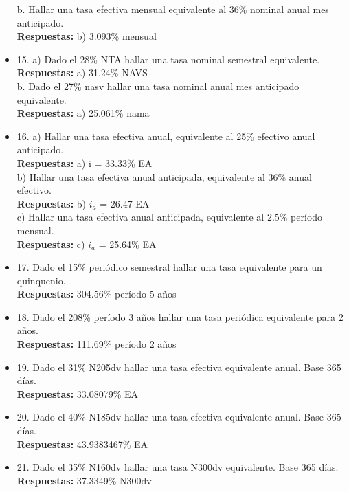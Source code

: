 \begin{itemize}
	b. Hallar una tasa efectiva mensual equivalente al 36\% nominal anual mes anticipado.\\
	\textbf{Respuestas:} b) 3.093\% mensual
	\medskip
	
	\item 15. a) Dado el 28\% NTA hallar una tasa nominal semestral equivalente.\\
	\textbf{Respuestas:} a) 31.24\% NAVS \\
	
	b. Dado el 27\% nasv hallar una tasa nominal anual mes anticipado equivalente.\\
	\textbf{Respuestas:} a) 25.061\% nama
	\medskip
	
	\item 16. a) Hallar una tasa efectiva anual, equivalente al 25\% efectivo anual anticipado.\\
	\textbf{Respuestas:} a) i = 33.33\% EA\\
	
	b) Hallar una tasa efectiva anual anticipada, equivalente al 36\% anual efectivo. \\
	\textbf{Respuestas:} b) $i_{a}$ = 26.47 EA\\
	
	c) Hallar una tasa efectiva anual anticipada, equivalente al 2.5\% período mensual.\\
	\textbf{Respuestas:} c) $i_{a}$ = 25.64\% EA
	\medskip
	
	\item 17. Dado el 15\% periódico semestral hallar una tasa equivalente para un quinquenio.\\
	\textbf{Respuestas:} 304.56\% período 5 años
	\medskip
	
	\item 18. Dado el 208\% período 3 años hallar una tasa periódica equivalente para 2 años.\\
	\textbf{Respuestas:} 111.69\% período 2 años
	\medskip
	
	\item 19. Dado el 31\% N205dv hallar una tasa efectiva equivalente anual. Base 365 días.\\
	\textbf{Respuestas:} 33.08079\% EA
	\medskip
	
	\item 20. Dado el 40\% N185dv hallar una tasa efectiva equivalente anual. Base 365 días.\\
	\textbf{Respuestas:} 43.9383467\% EA
	\medskip
	
	\item 21. Dado el 35\% N160dv hallar una tasa N300dv equivalente. Base 365 días.\\
	\textbf{Respuestas:} 37.3349\% N300dv
	\medskip
	

\end{itemize}
